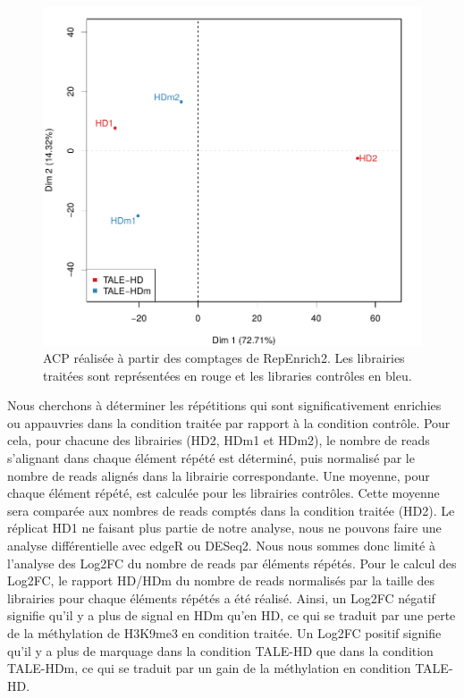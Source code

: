 \documentclass[a4paper,12pt,times]{report}
\newcommand{\scaption}[1]{\caption{\footnotesize{#1}}}
\begin{document}
\begin{figure}[!h]
\centering
\includegraphics [scale=0.45]{RepBase_PCA.png}
\scaption{ ACP réalisée à partir des comptages de RepEnrich2. Les librairies traitées sont représentées en rouge et les libraries contrôles en bleu.}
\label{ACP}
\end{figure}


Nous cherchons à déterminer les répétitions qui sont significativement enrichies ou appauvries dans la condition traitée par rapport à la condition contrôle. Pour cela, pour chacune des librairies (HD2, HDm1 et HDm2), le nombre de reads s'alignant dans chaque élément répété est déterminé, puis normalisé par le nombre de reads alignés dans la librairie correspondante. Une moyenne, pour chaque élément répété, est calculée pour les librairies contrôles. Cette moyenne sera comparée aux nombres de reads comptés dans la condition traitée (HD2).
Le réplicat HD1 ne faisant plus partie de notre analyse, nous ne pouvons faire une analyse différentielle avec edgeR ou DESeq2.
Nous nous sommes donc limité à l'analyse des Log2FC du nombre de reads par éléments répétés. Pour le calcul des Log2FC, le rapport HD/HDm du nombre de reads normalisés par la taille des librairies pour chaque éléments répétés a été réalisé. Ainsi, un Log2FC négatif signifie qu'il y a plus de signal en HDm qu'en HD, ce qui se traduit par une perte de la méthylation de H3K9me3 en condition traitée. Un Log2FC positif signifie qu'il y a plus de marquage  dans la condition TALE-HD que dans la condition TALE-HDm, ce qui se traduit par un gain de la méthylation en condition TALE-HD.
\end{document}
